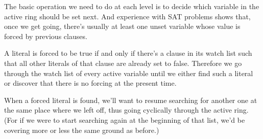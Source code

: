 The basic operation we need to do at each level is to decide
which variable in
the active ring should be set next. And experience with SAT problems shows
that, once we get going, there's usually at least one unset variable whose
value is forced by previous clauses.

A literal is forced to be true if and only if there's a clause in its watch
list
such that all other literals of that clause are already set to
false. Therefore we go through the watch list of every active variable until we
either find such a literal or discover that there is no forcing at the present
time.

When a forced literal is found, we'll want to resume searching for another one
at the same place where we left off, thus going cyclically through the active
ring. (For if we were to start searching again at the beginning of that list,
we'd be covering more or less the same ground as before.)

